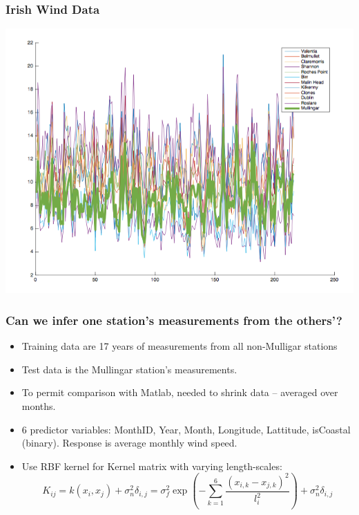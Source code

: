 \documentclass{beamer}
\begin{document}
\begin{frame}
\frametitle{Irish Wind Data}
\begin{center}
\includegraphics[scale=0.4]{fig3.png}
\end{center}
\end{frame}

\begin{frame}
\frametitle{Can we infer one station's measurements from the others'?}
\begin{itemize}
\item Training data are 17 years of measurements from all non-Mulligar stations
\item Test data is the Mullingar station's measurements.
\item To permit comparison with Matlab, needed to shrink data -- averaged over months.
\item 6 predictor variables: MonthID, Year, Month, Longitude, Lattitude, isCoastal (binary). Response is average monthly wind speed.
\item Use RBF kernel for Kernel matrix with varying length-scales:
$$K_{ij} = k(x_i, x_j)+\sigma_n^2\delta_{i,j} = \sigma_f^2 \exp(-\sum_{k=1}^6 \frac{(x_{i,k}-x_{j,k})^2}{l_i^2})+\sigma_n^2\delta_{i,j}$$
\end{itemize}
\end{frame}
\end{document}
